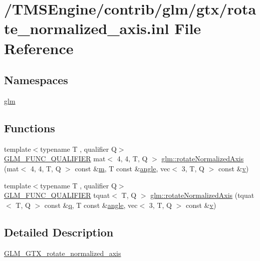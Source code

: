 \hypertarget{rotate__normalized__axis_8inl}{}\section{/\+T\+M\+S\+Engine/contrib/glm/gtx/rotate\+\_\+normalized\+\_\+axis.inl File Reference}
\label{rotate__normalized__axis_8inl}
\subsection*{Namespaces}
\begin{DoxyCompactItemize}
\item 
 \hyperlink{namespaceglm}{glm}
\end{DoxyCompactItemize}
\subsection*{Functions}
\begin{DoxyCompactItemize}
\item 
{\footnotesize template$<$typename T , qualifier Q$>$ }\\\hyperlink{setup_8hpp_a33fdea6f91c5f834105f7415e2a64407}{G\+L\+M\+\_\+\+F\+U\+N\+C\+\_\+\+Q\+U\+A\+L\+I\+F\+I\+ER} mat$<$ 4, 4, T, Q $>$ \hyperlink{group__gtx__rotate__normalized__axis_ga50efd7ebca0f7a603bb3cc11e34c708d}{glm\+::rotate\+Normalized\+Axis} (mat$<$ 4, 4, T, Q $>$ const \&\hyperlink{_s_d_l__opengl__glext_8h_af593500c283bf1a787a6f947f503a5c2}{m}, T const \&\hyperlink{_s_d_l__opengl__glext_8h_a9e06c1f76a20fed54ca742cd25cb02c4}{angle}, vec$<$ 3, T, Q $>$ const \&\hyperlink{_s_d_l__opengl_8h_a10a82eabcb59d2fcd74acee063775f90}{v})
\item 
{\footnotesize template$<$typename T , qualifier Q$>$ }\\\hyperlink{setup_8hpp_a33fdea6f91c5f834105f7415e2a64407}{G\+L\+M\+\_\+\+F\+U\+N\+C\+\_\+\+Q\+U\+A\+L\+I\+F\+I\+ER} tquat$<$ T, Q $>$ \hyperlink{group__gtx__rotate__normalized__axis_gad5bb8a155ee52fd349b88cec3a843600}{glm\+::rotate\+Normalized\+Axis} (tquat$<$ T, Q $>$ const \&\hyperlink{_s_d_l__opengl_8h_a8fc1e7b9baaae687804c7eed46ca09c6}{q}, T const \&\hyperlink{_s_d_l__opengl__glext_8h_a9e06c1f76a20fed54ca742cd25cb02c4}{angle}, vec$<$ 3, T, Q $>$ const \&\hyperlink{_s_d_l__opengl_8h_a10a82eabcb59d2fcd74acee063775f90}{v})
\end{DoxyCompactItemize}


\subsection{Detailed Description}
\hyperlink{group__gtx__rotate__normalized__axis}{G\+L\+M\+\_\+\+G\+T\+X\+\_\+rotate\+\_\+normalized\+\_\+axis} 